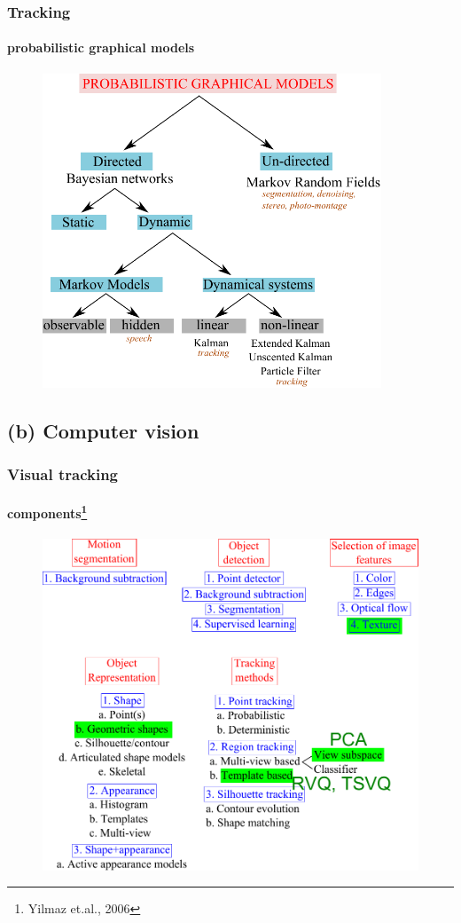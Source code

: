 \begin{frame}
\frametitle{Tracking}
\framesubtitle{probabilistic graphical models}
\logoCSIPCPL\mypagenum
	\begin{figure}
		\includegraphics[width=0.9\textwidth]{thesis/PRML_PGM_overview.pdf}
	\end{figure}
\end{frame}


\subsection{(b) Computer vision}

\begin{frame}
\frametitle{Visual tracking}
\framesubtitle{components\tiny{\footnote {Yilmaz et.al., 2006}}}
\logoCSIPCPL\mypagenum
\begin{figure}
\includegraphics[height=0.8\textheight]{thesis/TRK_overview.pdf}
\end{figure}	
\end{frame}


